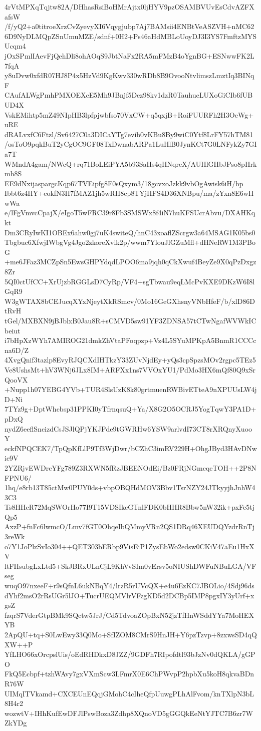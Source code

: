 4rVtMPXqTqjtw82A/DHhasRsiBoHMrAjtx0ljHYV9pzOSAMBVUvEsCdvAZFXafsW
/f/yQ2+a0titroeXrzCvZyevyXI6Vqygjubp7Aj7BAMsii4ENBtVeASZVH+nMC62
6D9NyDLMQpZSnUmuMZE/sdnf+0H2+Ps46aHdMBLoUoyDJ3I3YS7FmftzMYSUcqm4
jOxSPmlIAevFjQehDli8ohAOqS9JbtNaFx2RA5mFMzB4oYgnBG+ESNwwFK2L7fqA
y8uDvw0xfdR07HJ8P4x5HzVd9KgKwv330wRDb8B9OvooNtvlimszLmztIq3BINqF
CAufALWgPmhPMXOEXcE5Mh9JBnjf5Dez98kv1dzR0TauhucLUXoGiCIb6fUBUD4X
VskEMihtp5mZ49NIpHB3lpfpjwbfso70VxCW+q5qxjB+RoiFUURFh2H3OeWg+uRE
dRALvxfC6Ftzl/Sv6427C0a3DICaYTg7evib0vKBu8By9wiC0Ytf8LrFY57hTM81
/osToO9pqkBuT2yCgOC9GF08TxDwnabARPa1LuHlB0JynKCt7G0LNFykZy7GIa7T
WMndA4gam/NWcQ+rq71BoLEiPYA5b93SaHs4qHNqreX/AUHlGHbJPso8pHrkmh8S
EE9dNxijaspargcKqp67TVEipfg8F0sQxym3/18gcvxoJzkk9vbOgAwisk6iH/bp
Ibbt6z4HY+eokfN3H7fMAZ1jh5wRH8cp8TYjHFS4D36XNBpu/ma/zYxn8E6wHwWa
e/lFgVmvcCpajX/eIgoT5wFRC39r8Fb3SMSWx8f4iN7huKFSUcrAbvu/DXAHKqkt
Dm3CRyIwKI1OBEx6ahw0gj7uK4switeQ/hnC43xoaflZScrgw3a64MSAG1K05bs0
Tbgbuc6XfwjIWbgVg4Jgo2zkoreXvlk2p/wwm7YlouJlGZuMfl+dHNeRW1M3PBoG
+me6JFaz3MCZpSn5EwsGHPYdqdLPOO6ma9jqh0qCkXwuf4BeyZe9X0qPzDxgz8Zr
5QI0ctUfCC+XrUjzbRGGLsD7CyRp/VF4+sgTbwau9eqLMcPvKXE9DKzW6I8lGqR9
W3gWTAX8bCEJucqXYxNjeytXkRSmcv/0Mo16GeGXhsnyVNbHfeF/b/xlD86DtRvH
tGel/MXBXN9jBJblxB0Jau8R+sCMVD5sw91YF3ZDNSA57tCTwNgafWVWkICbeiut
i7bHpXzWYh7AMIROG21dmkZhVtaPFoqpzp+Vz4L5SYuMPKpA5BnmR1CCCcna6D/Z
4XvgQnif3tazlp8EvyRJQCXdIHTkzY33ZUvNjdEy+yQs3cpSpzsMOv2rgpc5TEz5
Ve8UshsMt+hV3WNj6JLx8IM+ARFXx1ns7VVOxYU1/PdMo3HX6mQf80Q9xSrQooVX
+Nupp1h07YEBG4YVb+TUR4SlsUzK8k80grtmuenRWBivETteA9nXPUUsLW4jD+Ni
7TYz9g+DptWhcbsp31PPKI0yTfrnqsuQ+Ya/X8G2O5OCRJ5YogTqwY3PA1D+pDxQ
nydZ6eeflSncizdCsJSJlQPjYKJPde9tGWRHw6YSW9arlvdI73CT8rXRQnyXuooY
eckfNPQCEK7/TpQpKfLlP9Tf3WjDwr/bCZhC3imRV229H+OhgJByd3HAvDNwie9V
2YZRjvEWDrcYFg789Z3RXWN5fRzJBEENOdEi/Bz0FRjNGmcqcTOH++2P8NFPNU6/
1hq/e8rb13T85ctMw0PUY0ds+vbpOBQHdMOV3Bbv1TsrNZY24JTkyyjhJnhW43C3
Ts8HHcR72MqSWOrHo77I9T15VDSIkcGTnlFDK0bHHR8Bbw5nW32ik+pxFc5tjQp5
AxzP+fnFc6lwmcO/Lmv7fGT0OhqeIbQMmyVRn2QS1DRq46XEUDQYzdrRnTj3reWk
o7Y1JoPlzSvIo304++QET303bERbp9VisEiP1ZysEbWo2edsw0CKiV47aEu1HxXV
ltFHsubgLxLtd5+SkJBRxULnCjL9KhVvSIm0vErsv5oNIUShDWFuNBuLGA/VFseg
wuqO97nxeeF+r9sQfnL6ukNBqY4/lrzR5rUVcQX+e4u6EzKC7JBOLio/4Sdj96ds
dYhf2msO2rRsUGr5lJO+TucrUEQMVlrVFzgKD5d2DCBp5IMP8pgxIY3yUrf+xgsZ
fzqrS7VderGtpBMk9SQctw5JrJ/Cd5TdvoaZOpBxN52jzTfHnWSddYYa7MoHEXYB
2ApQU+tq+S0LwEwy33Q0Mo+SfIZOM8CMrS9HnJH+Y6pzTzvp+8zxwsSD4qQXW++P
YfLHO66xOrcpslUis/oEdRHDkxD8JZZ/9GDFh7RIpofdtl93bJzNv0dQKLA/gGPO
FkQ5Ecbpf+tzhWAvy7gxVXmScw3LFmrX0E6ChPWvpP2hpbXu5koH8qkvaBDnR76W
UIMqITVkamd+CXCEUnEQqjGMohC4cIheQfpUuwgPLhAlFvom/knTXlpN3bL8H4r2
wozwtV+IHhKufEwDFJlPswBoza3Zdhp8XQnoVD5gGGQkEeNtYJTC7B6zr7WZkYDg
